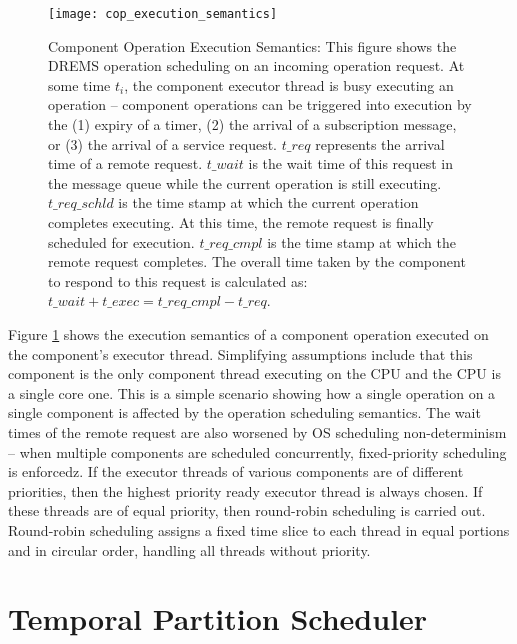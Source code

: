 \begin{figure}[ht]
	\centering
	\texttt{[image: cop\_execution\_semantics]}
	\caption{Component Operation Execution Semantics: This figure shows the DREMS operation scheduling on an incoming operation request. At some time $t_{i}$, the component executor thread is busy executing an operation -- component operations can be triggered into execution by the (1) expiry of a timer, (2) the arrival of a subscription message, or (3) the arrival of a service request. $t\_{req}$ represents the arrival time of a remote request. $t\_{wait}$ is the wait time of this request in the message queue while the current operation is still executing. $t\_{req\_schld}$ is the time stamp at which the current operation completes executing. At this time, the remote request is finally scheduled for execution. $t\_{req\_cmpl}$ is the time stamp at which the remote request completes. The overall time taken by the component to respond to this request is calculated as: $t\_{wait} + t\_{exec} = t\_{req\_cmpl} - t\_{req}$.}
	\label{fig:cop_execution_semantics}
\end{figure}

Figure \ref{fig:cop_execution_semantics} shows the execution semantics of a component operation executed on the component's executor thread. Simplifying assumptions include that this component is the only component thread executing on the CPU and the CPU is a single core one. This is a simple scenario showing how a single operation on a single component is affected by the operation scheduling semantics. The wait times of the remote request are also worsened by OS scheduling non-determinism -- when multiple components are scheduled concurrently, fixed-priority scheduling is enforcedz. If the executor threads of various components are of different priorities, then the highest priority ready executor thread is always chosen. If these threads are of equal priority, then round-robin scheduling is carried out. Round-robin scheduling assigns a fixed time slice to each thread in equal portions and in circular order, handling all threads without priority. %

\section{Temporal Partition Scheduler}

